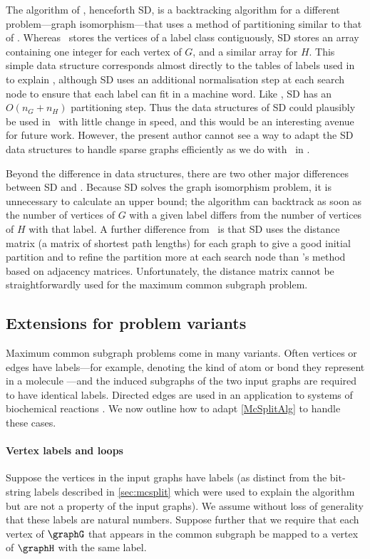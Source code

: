The algorithm of \citet{DBLP:journals/jacm/SchmidtD76},
henceforth SD, is a backtracking algorithm for a different
problem---graph isomorphism---that uses a method of partitioning
similar to that of \McSplit. Whereas \McSplit\ stores the vertices of a label
class contiguously, SD stores an array containing one integer for each vertex
of $G$, and a similar array for $H$.
This simple data
structure corresponds almost directly to the tables of labels used in
 to explain \McSplit, although SD uses an
additional normalisation step at each search node to ensure that each label can
fit in a machine word.  Like \McSplit, SD has an $O(n_G + n_H)$ partitioning
step. Thus the data structures of SD could plausibly be used in \McSplit\ with
little change in speed, and this would be an interesting avenue for future
work.  However, the present author cannot see a way to adapt the SD data
structures to handle sparse graphs efficiently as we do with \McSplit\ in
.

Beyond the difference in data structures, there are two other
major differences between SD and \McSplit.
Because SD solves the
graph isomorphism problem, it is unnecessary to calculate an upper bound; the
algorithm can backtrack as soon as the number of vertices of $G$ with a given
label differs from the number of vertices of $H$ with that label.  A further
difference from \McSplit\ is that SD uses
the distance matrix (a matrix of shortest path lengths) for each
graph to give a good initial partition and to refine the partition more at each
search node than \McSplit's method based on adjacency matrices. Unfortunately,
the distance matrix cannot be straightforwardly used for the maximum common
subgraph problem.

\subsection{Extensions for problem variants}\label{sec:extensions}

Maximum common subgraph problems come in many variants. Often
vertices or edges have labels---for example, denoting the kind of atom or bond they represent in
a molecule \citep{Ehrlich:2011}---and the induced subgraphs of the two input graphs are
required to have identical labels.  Directed edges are used in an application to systems
of biochemical reactions \citep{DAM2014}.
We now outline how to adapt \cref{McSplitAlg} to handle these cases.

\paragraph{Vertex labels and loops} Suppose the vertices in the input graphs have labels
(as distinct from the bit-string labels described in \cref{sec:mcsplit} which were used to
explain the algorithm but are not a property of the input graphs). We assume without loss
of generality that these labels are natural numbers. Suppose further that
we require that each vertex of $\graphG$ that appears in the common subgraph be mapped to a vertex
of $\graphH$ with the same label.

